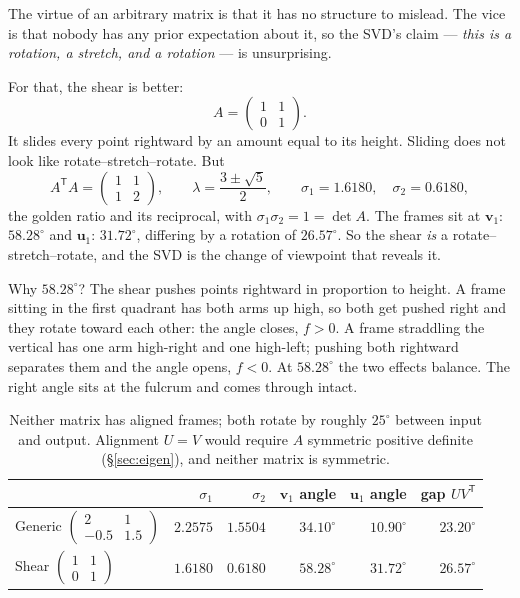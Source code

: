 \documentclass[11pt]{article}
\numberwithin{equation}{section}
\newcommand{\T}{^{\mathsf{T}}}
\newcommand{\vv}[1]{\mathbf{v}_{#1}}
\newcommand{\uu}[1]{\mathbf{u}_{#1}}
\theoremstyle{plainish}
\begin{document}
The virtue of an arbitrary matrix is that it has no structure to mislead. The
vice is that nobody has any prior expectation about it, so the SVD's claim ---
\emph{this is a rotation, a stretch, and a rotation} --- is unsurprising.

For that, the shear is better:
\begin{equation}A = \begin{pmatrix} 1 & 1 \\ 0 & 1\end{pmatrix} .
\end{equation}
It slides every point rightward by an amount equal to its height. Sliding does
not look like rotate--stretch--rotate. But
\begin{equation}A\T A = \begin{pmatrix} 1 & 1 \\ 1 & 2\end{pmatrix},
\qquad \lambda = \frac{3\pm\sqrt5}{2},
\qquad \sigma_1 = 1.6180, \quad \sigma_2 = 0.6180 ,
\end{equation}
the golden ratio and its reciprocal, with $\sigma_1\sigma_2 = 1 = \det A$. The
frames sit at $\vv1$: $58.28^\circ$ and $\uu1$: $31.72^\circ$, differing by a
rotation of $26.57^\circ$. So the shear \emph{is} a rotate--stretch--rotate,
and the SVD is the change of viewpoint that reveals it.

Why $58.28^\circ$? The shear pushes points rightward in proportion to height.
A frame sitting in the first quadrant has both arms up high, so both get pushed
right and they rotate toward each other: the angle closes, $f > 0$. A frame
straddling the vertical has one arm high-right and one high-left; pushing both
rightward separates them and the angle opens, $f < 0$. At $58.28^\circ$ the two
effects balance. The right angle sits at the fulcrum and comes through intact.

\begin{table}[h]
\centering
\begin{tabular}{@{}lrrrrr@{}}
\toprule
& $\sigma_1$ & $\sigma_2$ & $\vv1$ angle & $\uu1$ angle & gap $UV\T$ \\
\midrule
Generic $\left(\begin{smallmatrix}2&1\\-0.5&1.5\end{smallmatrix}\right)$
  & $2.2575$ & $1.5504$ & $34.10^\circ$ & $10.90^\circ$ & $23.20^\circ$ \\
Shear $\left(\begin{smallmatrix}1&1\\0&1\end{smallmatrix}\right)$
  & $1.6180$ & $0.6180$ & $58.28^\circ$ & $31.72^\circ$ & $26.57^\circ$ \\
\bottomrule
\end{tabular}
\caption{Neither matrix has aligned frames; both rotate by roughly $25^\circ$
between input and output. Alignment $U = V$ would require $A$ symmetric
positive definite (\S\ref{sec:eigen}), and neither matrix is symmetric.}
\end{table}
\end{document}
